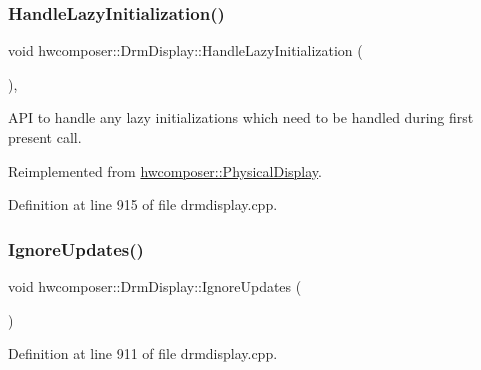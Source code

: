 \subsubsection{\texorpdfstring{Handle\+Lazy\+Initialization()}{HandleLazyInitialization()}}
{\footnotesize\ttfamily void hwcomposer\+::\+Drm\+Display\+::\+Handle\+Lazy\+Initialization (\begin{DoxyParamCaption}{ }\end{DoxyParamCaption})\hspace{0.3cm}{\ttfamily [override]}, {\ttfamily [virtual]}}

A\+PI to handle any lazy initializations which need to be handled during first present call. 

Reimplemented from \mbox{\hyperlink{classhwcomposer_1_1PhysicalDisplay_ab8e24e90adf5eaa76da5cb827ad82c65}{hwcomposer\+::\+Physical\+Display}}.



Definition at line 915 of file drmdisplay.\+cpp.


\begin{DoxyCode}{0}
\end{DoxyCode}
\mbox{\label{classhwcomposer_1_1DrmDisplay_a0ac8713e1c6c26d0721295c8c6277540}} 
\subsubsection{\texorpdfstring{Ignore\+Updates()}{IgnoreUpdates()}}
{\footnotesize\ttfamily void hwcomposer\+::\+Drm\+Display\+::\+Ignore\+Updates (\begin{DoxyParamCaption}{ }\end{DoxyParamCaption})}



Definition at line 911 of file drmdisplay.\+cpp.


\begin{DoxyCode}{0}
\end{DoxyCode}
\mbox{\label{classhwcomposer_1_1DrmDisplay_a6dd7060290f6be414485d743d1e7d226}} 
